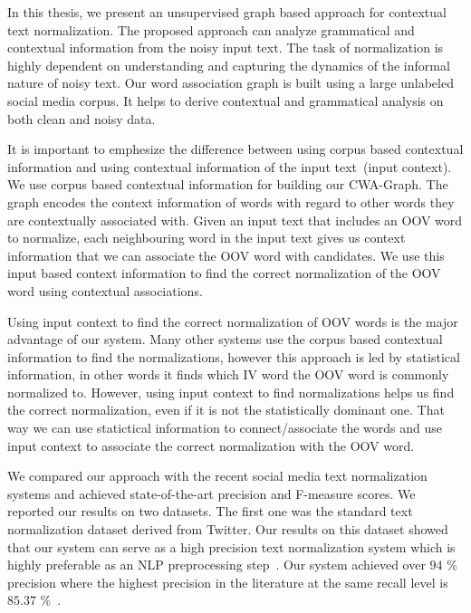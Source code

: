 \documentclass[a4paper,onesided,12pt]{report}
\begin{document}
In this thesis, we present an unsupervised graph based approach for contextual text normalization. The proposed approach can analyze grammatical and contextual information from the noisy input text. The task of normalization is highly dependent on understanding and capturing the dynamics of the informal nature of noisy text. Our word association graph is built using a large unlabeled social media corpus. It helps to derive contextual and grammatical analysis on both clean and noisy data.

It is important to emphesize the difference between using corpus based contextual information and using contextual information of the input text~(input context). We use corpus based contextual information for building our CWA-Graph. The graph encodes the context information of words with regard to other words they are contextually associated with. Given an input text that includes an OOV word to normalize, each neighbouring word in the input text gives us context information that we can associate the OOV word with candidates. We use this input based context information to find the correct normalization of the OOV word using contextual associations.

Using input context to find the correct normalization of OOV words is the major advantage of our system. Many other systems use the corpus based contextual information to find the normalizations, however this approach is led by statistical information, in other words it finds which IV word the OOV word is commonly normalized to. However, using input context to find normalizations helps us find the correct normalization, even if it is not the statistically dominant one.  That way we can use statictical information to connect/associate the words and use input context to associate the correct normalization with the OOV word.

We compared our approach with the recent social media text normalization systems and achieved state-of-the-art precision and F-measure scores. We reported our results on two datasets. The first one was the standard text normalization dataset derived from Twitter. Our results on this dataset showed that our system can serve as a high precision text normalization system which is highly preferable as an NLP preprocessing step~\cite{DBLP:conf/acl/HassanM13}. Our system achieved over $94$ \% precision where the highest precision in the literature at the same recall level is $85.37$ \%~\cite{DBLP:conf/acl/HassanM13}.
\end{document}
